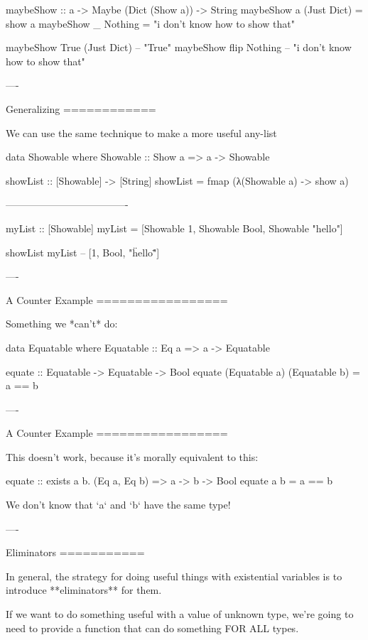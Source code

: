 \begin{hs}
  maybeShow :: a -> Maybe (Dict (Show a)) -> String
  maybeShow a (Just Dict) = show a
  maybeShow _ Nothing     = "i don't know how to show that"


  maybeShow True (Just Dict)  -- "True"
  maybeShow flip Nothing      -- "i don't know how to show that"
\end{hs}

----

Generalizing
============

We can use the same technique to make a more useful any-list

\begin{hs}
  data Showable where
    Showable :: Show a => a -> Showable

  showList :: [Showable] -> [String]
  showList = fmap (λ(Showable a) -> show a)

  -------------------------------------

  myList :: [Showable]
  myList = [Showable 1, Showable Bool, Showable "hello"]

  showList myList  -- [1, Bool, "\"hello\""]
\end{hs}

----

A Counter Example
=================

Something we *can't* do:

\begin{hs}
  data Equatable where
    Equatable :: Eq a => a -> Equatable

  equate :: Equatable -> Equatable -> Bool
  equate (Equatable a) (Equatable b) = a == b
\end{hs}

----

A Counter Example
=================

This doesn't work, because it's morally equivalent to this:

\begin{hs}
  equate :: exists a b. (Eq a, Eq b) => a -> b -> Bool
  equate a b = a == b
\end{hs}

We don't know that `a` and `b` have the same type!

----

Eliminators
===========

In general, the strategy for doing useful things with existential variables is to introduce **eliminators** for them.

If we want to do something useful with a value of unknown type, we're going to need to provide a function that can do
something FOR ALL types.

